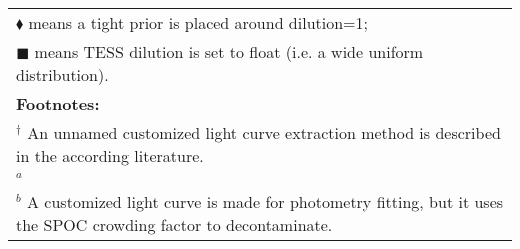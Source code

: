 \begin{longtable}{llrllr}
\multicolumn{6}{l}{$\blacklozenge$ means a tight prior is placed around dilution=1;} \\
\multicolumn{6}{l}{$\blacksquare$ means TESS dilution is set to float (i.e. a wide uniform distribution).} \\
\multicolumn{6}{l}{\textbf{Footnotes:}} \\
\multicolumn{6}{l}{$^\dagger$ An unnamed customized light curve extraction method is described in the according literature. } \\
\multicolumn{6}{l}{$^a$ \cite{TASOC}} \\
\multicolumn{6}{l}{$^b$ A customized light curve is made for photometry fitting, but it uses the SPOC crowding factor to decontaminate.} \\
\end{longtable}